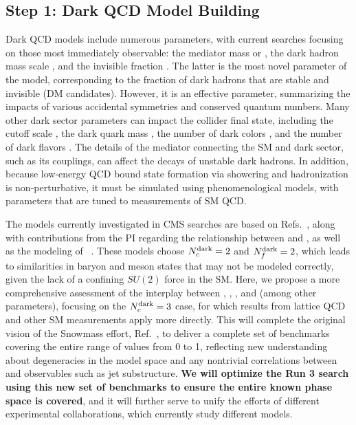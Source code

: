 \subsection{Step 1: Dark QCD Model Building}\label{subsec:models}

Dark QCD models include numerous parameters, with current searches focusing on those most immediately observable:
the mediator mass \mZprime or \mbifun, the dark hadron mass scale \mdark, and the invisible fraction \rinv.
The latter is the most novel parameter of the model, corresponding to the fraction of dark hadrons that are stable and invisible (DM candidates).
However, it is an effective parameter, summarizing the impacts of various accidental symmetries and conserved quantum numbers.
Many other dark sector parameters can impact the collider final state, including the cutoff scale \Lamdark, the dark quark mass \mqdark, the number of dark colors \Ncdark, and the number of dark flavors \Nfdark.
The details of the mediator connecting the SM and dark sector, such as its couplings, can affect the decays of unstable dark hadrons.
In addition, because low-energy QCD bound state formation via showering and hadronization is non-perturbative, it must be simulated using phenomenological models,
with parameters that are tuned to measurements of SM QCD.

The models currently investigated in CMS searches are based on Refs.~\cite{Cohen:2015toa,Cohen:2017pzm}, along with contributions from the PI
regarding the relationship between \mdark and \Lamdark, as well as the modeling of \rinv~\cite{Albouy:2022cin}.
These models choose $N_{c}^{\text{dark}}=2$ and $N_{f}^{\text{dark}}=2$, which leads to similarities in baryon and meson states that may not be modeled correctly,
given the lack of a confining $SU(2)$ force in the SM.
Here, we propose a more comprehensive assessment of the interplay between \Nfdark, \Lamdark, \mdark, and \mqdark (among other parameters),
focusing on the $N_{c}^{\text{dark}}=3$ case, for which results from lattice QCD and other SM measurements apply more directly.
This will complete the original vision of the Snowmass effort, Ref.~\cite{Albouy:2022cin},
to deliver a complete set of benchmarks covering the entire range of \rinv values from 0 to 1,
reflecting new understanding about degeneracies in the model space and any nontrivial correlations between \rinv and observables such as jet substructure.
\textbf{We will optimize the Run 3 search using this new set of benchmarks to ensure the entire known phase space is covered},
and it will further serve to unify the efforts of different experimental collaborations, which currently study different models.

